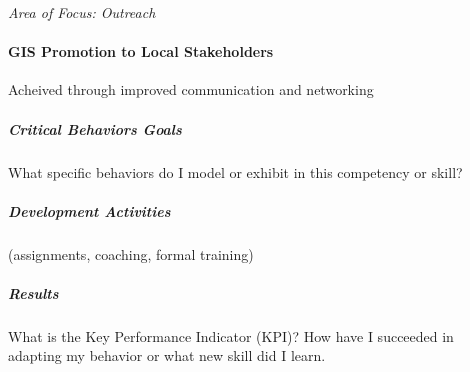 \textit{Area of Focus: Outreach}
\paragraph{GIS Promotion to Local Stakeholders}

Acheived through improved communication and networking

\subparagraph{Critical Behaviors Goals}

What specific behaviors do I model or exhibit in this competency or skill? 
\vspace{.3in}

\subparagraph{Development Activities}

(assignments, coaching, formal training)
\vspace{.3in}

\subparagraph{Results}

What is the Key Performance Indicator (KPI)? How have I succeeded in adapting my behavior or what new skill did I learn.       


